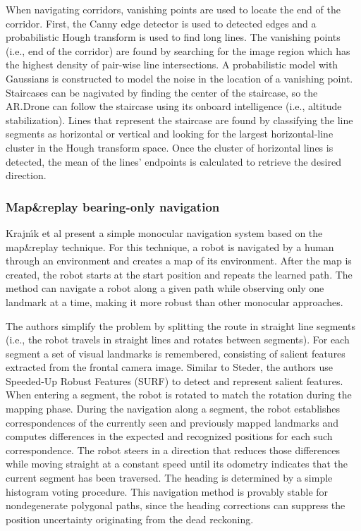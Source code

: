 When navigating corridors, vanishing points are used to locate the end of the corridor. 
First, the Canny edge detector is used to detected edges and a probabilistic Hough transform is used to find long lines.
The vanishing points (i.e., end of the corridor) are found by searching for the image region which has the highest density of pair-wise line intersections.
A probabilistic model with Gaussians is constructed to model the noise in the location of a vanishing point.
Staircases can be nagivated by finding the center of the staircase, so the AR.Drone can follow the staircase using its onboard intelligence (i.e., altitude stabilization).
Lines that represent the staircase are found by classifying the line segments as horizontal or vertical and looking for the largest horizontal-line cluster in the Hough transform space.
Once the cluster of horizontal lines is detected, the mean of the lines' endpoints is calculated to retrieve the desired direction.

\subsubsection{Map\&replay bearing-only navigation}
Krajn{\'\i}k et al \cite{krajník2010simple,faiglsurveillance,krajník2011ar} present a simple monocular navigation system based on the map\&replay technique.
For this technique, a robot is navigated by a human through an environment and creates a map of its environment.
After the map is created, the robot starts at the start position and repeats the learned path.
The method can navigate a robot along a given path while observing only one landmark at a time, making it more robust than other monocular approaches.

The authors simplify the problem by splitting the route in straight line segments (i.e., the robot travels in straight lines and rotates between segments).
For each segment a set of visual landmarks is remembered, consisting of salient features extracted from the frontal camera image.
Similar to Steder, the authors use Speeded-Up Robust Features (SURF) to detect and represent salient features.
When entering a segment, the robot is rotated to match the rotation during the mapping phase.
During the navigation along a segment, the robot establishes correspondences of the currently seen and previously mapped landmarks and computes differences in the expected and recognized positions for each such correspondence.
The robot steers in a direction that reduces those differences while moving straight at a constant speed until its odometry indicates that the current segment has been traversed.
The heading is determined by a simple histogram voting procedure.
This navigation method is provably stable for nondegenerate polygonal paths, since the heading corrections can suppress the position uncertainty originating from the dead reckoning.

